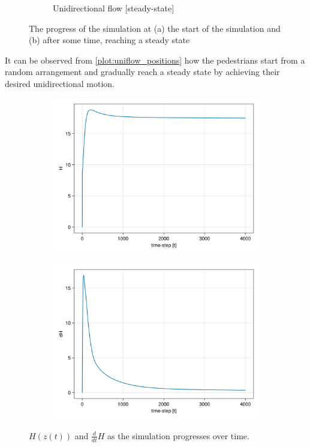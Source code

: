 \begin{figure}[H]
\begin{subfigure}{.49\textwidth}
        \caption{Unidirectional flow [steady-state]}
    \end{subfigure}
    \caption{The progress of the simulation at (a) the start of the simulation and (b) after some time, reaching a steady state}
    \label{plot:uniflow_positions}
\end{figure}

\pagebreak
It can be observed from \autoref{plot:uniflow_positions} how the pedestrians start from a random arrangement and gradually reach a steady state by achieving their desired unidirectional motion.
\begin{figure}[H]
    \centering
    \begin{subfigure}{.49\textwidth}
        \centering
        \includegraphics[width=\linewidth]{figures/H_Uniflow.png}
    \end{subfigure}
    \begin{subfigure}{.49\textwidth}
        \centering
        \includegraphics[width=\linewidth]{figures/dH_Uniflow.png}
    \end{subfigure}
    \caption{$H(z(t))$ and $\frac{d}{dt}H$ as the simulation progresses over time.}
    \label{plot:uniflow_hamiltonian}
\end{figure}


